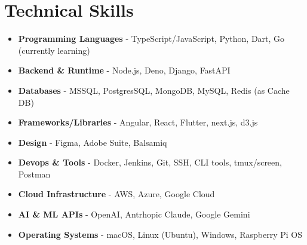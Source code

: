 \section{Technical Skills}
{
	\normalsize
	\begin{itemize}[topsep=0pt, partopsep=0pt, itemsep=0pt, parsep=0pt]
		\item \textbf{Programming Languages} - TypeScript/JavaScript, Python, Dart, Go (currently learning)
		\item \textbf{Backend \& Runtime} - Node.js, Deno, Django, FastAPI
		\item \textbf{Databases} - MSSQL, PostgresSQL, MongoDB, MySQL, Redis (as Cache DB)
		\item \textbf{Frameworks/Libraries} - Angular, React, Flutter, next.js, d3.js
		\item \textbf{Design} - Figma, Adobe Suite, Balsamiq
		\item \textbf{Devops \& Tools} - Docker, Jenkins, Git, SSH, CLI tools, tmux/screen, Postman
		\item \textbf{Cloud Infrastructure} - AWS, Azure, Google Cloud
		\item \textbf{AI \& ML APIs} - OpenAI, Antrhopic Claude, Google Gemini
		\item \textbf{Operating Systems} - macOS, Linux (Ubuntu), Windows, Raspberry Pi OS
	\end{itemize}
}